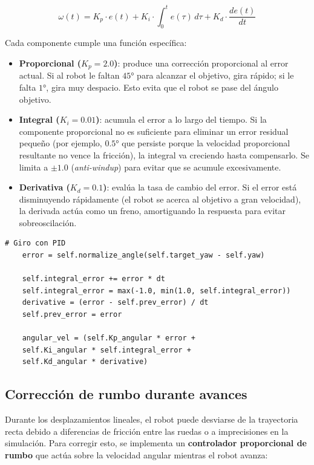 \begin{equation}
	\omega(t) = K_p \cdot e(t) + K_i \cdot \int_0^t e(\tau)\,d\tau + K_d \cdot \frac{de(t)}{dt}
\end{equation}

Cada componente cumple una función específica:

\begin{itemize}
	\item \textbf{Proporcional ($K_p = 2.0$)}: produce una corrección proporcional al error actual. Si al robot le faltan $45°$ para alcanzar el objetivo, gira rápido; si le falta $1°$, gira muy despacio. Esto evita que el robot se pase del ángulo objetivo.
	\item \textbf{Integral ($K_i = 0.01$)}: acumula el error a lo largo del tiempo. Si la componente proporcional no es suficiente para eliminar un error residual pequeño (por ejemplo, $0.5°$ que persiste porque la velocidad proporcional resultante no vence la fricción), la integral va creciendo hasta compensarlo. Se limita a $\pm 1.0$ (\textit{anti-windup}) para evitar que se acumule excesivamente.
	\item \textbf{Derivativa ($K_d = 0.1$)}: evalúa la tasa de cambio del error. Si el error está disminuyendo rápidamente (el robot se acerca al objetivo a gran velocidad), la derivada actúa como un freno, amortiguando la respuesta para evitar sobreoscilación.
\end{itemize}

\begin{lstlisting}[style=python]
	# Giro con PID
	error = self.normalize_angle(self.target_yaw - self.yaw)
	
	self.integral_error += error * dt
	self.integral_error = max(-1.0, min(1.0, self.integral_error))
	derivative = (error - self.prev_error) / dt
	self.prev_error = error
	
	angular_vel = (self.Kp_angular * error +
	self.Ki_angular * self.integral_error +
	self.Kd_angular * derivative)
\end{lstlisting}

\subsection*{Corrección de rumbo durante avances}

Durante los desplazamientos lineales, el robot puede desviarse de la trayectoria recta debido a diferencias de fricción entre las ruedas o a imprecisiones en la simulación. Para corregir esto, se implementa un \textbf{controlador proporcional de rumbo} que actúa sobre la velocidad angular mientras el robot avanza:

